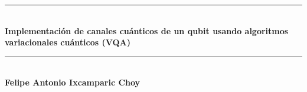 \documentclass[11pt, spanish, letterpage]{article} %
\date{}
\begin{document}
\begin{titlepage} %
\newcommand{\HRule}{\rule{\linewidth}{0.5mm}} %

\center %

	
\HRule\\[0.6cm]

{\huge\bfseries Implementación de canales cuánticos de un qubit usando algoritmos variacionales cuánticos (VQA) }\\[0.5cm] %

\HRule\\[2cm]



\Large{\textbf{Felipe Antonio Ixcamparic Choy}}\\ [2cm] %



\end{titlepage}
\end{document}
